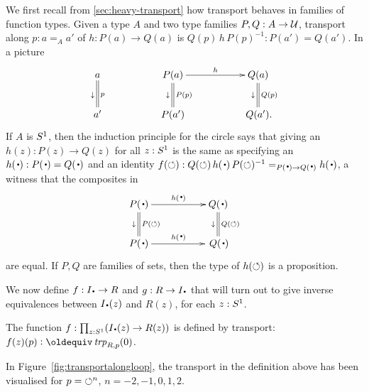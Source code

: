 We first recall from \cref{sec:heavy-transport} how 
transport behaves in families of function types.  
Given a type $A$ and two type families $P,Q:A\to\mathcal{U}$,  
transport along $p:a=_Aa'$ of $h:P(a)\to Q(a)$ is $Q(p)\,h\,P(p)^{-1}:P(a')=Q(a')$.
In a picture
\[
\xymatrix{
a\ar@{=}[d]^{p}_\downarrow &&
P(a)\ar[rr]^{h}\ar@{=}[d]^{P(p)}_\downarrow&&
Q(a)\ar@{=}[d]^{Q(p)}_\downarrow\\
a'&&P(a')&&\,Q(a').}
\]
If $A$ is ${S^1}$, then the induction principle for the circle says 
that giving an $h(z):P(z)\to Q(z)$ for all $z:{S^1}$ is the same as 
specifying an $h(\base):P(\base)=Q(\base)$ and an identity 
$f(\Sloop):Q(\Sloop)\,h(\base)\,P(\Sloop)^{-1}=_{P(\base)\to Q(\base)}h(\base)$,
\ie   a witness that the composites in 
$$\xymatrix{
  P(\base)\ar[rr]^{h(\base)}\ar@{=}[d]^{P(\Sloop)}_\downarrow
 &&Q(\base)\ar@{=}[d]^{Q(\Sloop)}_\downarrow\\
  P(\base)\ar[rr]^{h(\base)}&&\,Q(\base)}
$$
are equal. If $P,Q$ are families of sets, 
then the type of $h(\circlearrowleft)$ is a proposition.

We now define $f: \uc{\base}\to R$ and $g: R\to\uc{\base}$ that will turn out to
give inverse equivalences between $\uc{\base}(z)$ and $R(z)$, for each $z:{S^1}$.

\begin{definition}
  \label{def:fPtoR}
  The function $f:\prod_{z:\Sc}(\uc{\base}(z)\to R(z))$ is defined by transport: $f(z)(p)\defequi\trp{R,p}(0)$.
\end{definition}

In Figure~\ref{fig:transportalongloop}, the transport in the definition
above has been visualised for $p={\circlearrowleft^n}$, $n=-2,-1,0,1,2$.

